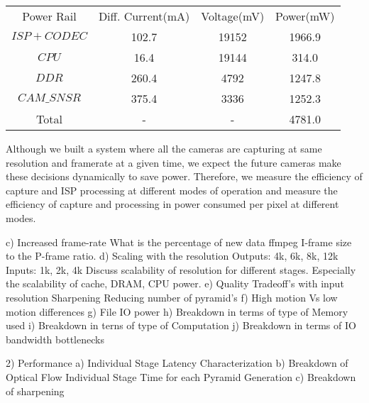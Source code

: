 		\begin{tabular}{c|c|c|c}
			Power Rail  & Diff. Current(mA) & Voltage(mV) & Power(mW)   \\
			$ISP+CODEC$ & 102.7             & 19152       & 1966.9      \\
			$CPU$ & 16.4              & 19144       & 314.0       \\
			$DDR$ & 260.4             & 4792        & 1247.8      \\
			$CAM\_SNSR$ & 375.4             & 3336        & 1252.3      \\
			Total       & -                 & -           & 4781.0      \\
		\end{tabular} \newline
		
		Although we built a system where all the cameras are capturing at same resolution and framerate at a given time, we expect the future cameras make these decisions dynamically to save power. Therefore, we  measure the efficiency of capture and ISP processing at different modes of operation and measure the efficiency of capture and processing in power consumed per pixel at different modes.
		
		

	c) Increased frame-rate\newline
		What is the percentage of new data
			ffmpeg I-frame size to the P-frame ratio.
	d) Scaling with the resolution\newline
			Outputs:
			4k, 6k, 8k, 12k
			Inputs:
			1k, 2k, 4k
		Discuss scalability of resolution for different stages. \newline
		Especially the scalability of cache, DRAM, CPU power. 
	e) Quality Tradeoff's with input resolution\newline
			Sharpening
			Reducing number of pyramid's
	f) High motion Vs low motion differences
	g) File IO power
	h) Breakdown in terms of type of Memory	used
	i) Breakdown in terns of type of Computation
	j) Breakdown in terms of IO bandwidth bottlenecks
	
	

2) Performance \newline
	a) Individual Stage Latency Characterization
	b) Breakdown of Optical Flow
		Individual Stage
		Time for each Pyramid Generation
	c) Breakdown of sharpening
	


